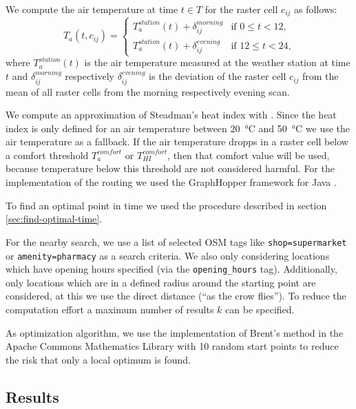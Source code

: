 We compute the air temperature at time $t\in T$ for the raster cell $c_{ij}$ as follows:
\begin{equation}
\label{eq:derived-temperature}
T_a(t, c_{ij}) = \begin{cases}
T_{a}^{station}(t) + \delta_{ij}^{morning} & \text{if $0 \leq t < 12$,}\\
T_{a}^{station}(t) + \delta_{ij}^{evening} & \text{if $12 \leq t < 24$,}
\end{cases}
\end{equation}
where $T_{a}^{station}(t)$ is the air temperature measured at the weather station at time $t$ and $\delta^{morning}_{ij}$ respectively  $\delta^{evening}_{ij}$ is the deviation of the raster cell $c_{ij}$ from the mean of all raster cells from the morning respectively evening scan.

We compute an approximation of Steadman's heat index with \textcite[77]{Stull2011}. Since the heat index is only defined for an air temperature between \SI{20}{\celsius} and \SI{50}{\celsius} we use the air temperature as a fallback. If the air temperature dropps in a raster cell below a comfort threshold $T_a^{comfort}$ or $T_{HI}^{comfort}$, then that comfort value will be used, because temperature below this threshold are not considered harmful. 
For the implementation of the routing we used the GraphHopper framework for Java \parencite{GraphHopper2016,GraphHopper2016a}.


To find an optimal point in time we used the procedure described in section \ref{sec:find-optimal-time}. 

For the nearby search, we  use a list of selected OSM tags like \verb|shop=supermarket| or \verb|amenity=pharmacy| as a search criteria. We also only considering locations which have opening hours specified (via the \verb|opening_hours| tag). Additionally, only locations which are in a defined radius around the starting point are considered, at this we use the direct distance (“as the crow flies”). To reduce the computation effort a maximum number of results $k$ can be specified.

As optimization algorithm, we use the implementation of Brent's method in the Apache Commons Mathematics Library \parencite{ASF2016} with 10 random start points to reduce the risk that only a local optimum is found.

\subsection{Results}

